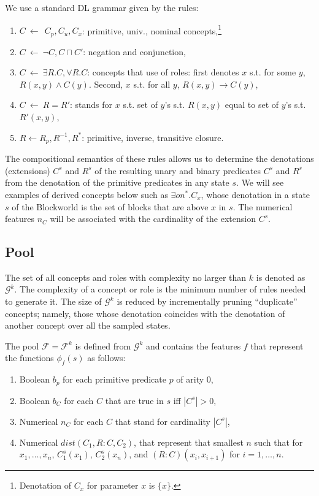 \documentclass[letterpaper]{article} %
\newcommand{\F}{\mathcal{F}}
\renewcommand{\S}{\mathcal{S}}
\newcommand{\G}{\mathcal{G}}
\begin{document}
We use a standard  DL grammar  given by the rules:
\begin{enumerate}[{\small$\bullet$}]
  \item $C \ \leftarrow\ \ C_p, C_u, C_x$: primitive, univ.,  nominal concepts,\footnote{Denotation of $C_x$ for parameter $x$ is $\{x\}$.}
  \item $C \ \leftarrow\  \neg C, C \sqcap C'$: negation and conjunction, 
  \item $C \ \leftarrow\  \exists R.C , \forall R.C$: concepts that use of  roles: first denotes $x$ s.t. for some  $y$,  $R(x,y) \land C(y)$.
  Second,  $x$ s.t. for all $y$, $R(x,y) \rightarrow C(y)$,
  \item $C \ \leftarrow\  R=R'$: stands for $x$ s.t. set of $y$'s  s.t. $R(x,y)$ equal to set of $y$'s s.t. $R'(x,y)$,
    \item $R \leftarrow R_p, R^{-1}, R^*$: primitive, inverse, transitive closure.
 \end{enumerate}

The  compositional  semantics   of these rules allows us to determine the denotations (extensions)   $C^s$ and $R^s$  of
the resulting unary and binary predicates $C^s$ and $R^s$ from the denotation of the primitive predicates
in any  state $s$. We will see examples of derived concepts below such as ${\exists on^* . C_x}$,
whose denotation in a state $s$ of the Blockworld is the set of blocks that are above $x$ in $s$.
The numerical features $n_C$ will be associated with the cardinality of the extension $C^s$. 


\subsection{Pool}

The set of all concepts and roles with complexity no larger than $k$ is
denoted as $\G^k$. The complexity of a concept or role is the minimum
number of rules needed to generate it. The size of $\G^k$ is reduced by
incrementally pruning ``duplicate'' concepts; namely, those whose denotation
coincides with the denotation of another concept over all the sampled states.

The pool $\F=\F^k$  is defined from $\G^k$ and contains
the  features $f$ that represent the functions $\phi_f(s)$ as follows:
\begin{enumerate}[{\small$\bullet$}]
\item Boolean $b_p$ for each primitive predicate $p$ of arity $0$,
\item Boolean $b_C$ for each $C$ that are true in $s$ iff $|C^s| > 0$,
\item Numerical $n_C$ for each $C$ that stand for cardinality $|C^s|$,
\item Numerical $\textit{dist}(C_1,R:C,C_2)$, that represent that smallest
  $n$ such that for $x_1, \ldots, x_n$, $C_1^s(x_1)$, $C_2^s(x_{n})$, and
  $(R:C)(x_i,x_{i+1})$ for $i=1, \ldots, n$. 
\end{enumerate}  
\end{document}
